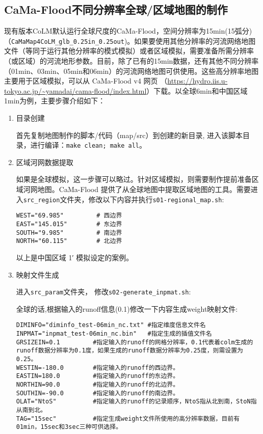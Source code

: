 \subsection{CaMa-Flood不同分辨率全球/区域地图的制作}
现有版本CoLM默认运行全球尺度的CaMa-Flood，空间分辨率为15min(15弧分)（\texttt{CaMaMap4CoLM\_glb\_0.25in\_0.25out})。如果要使用其他分辨率的河流网络地图文件（等同于运行其他分辨率的模式模拟）或者区域模拟，需要准备所需分辨率（或区域）的河流地形参数。目前，除了已有的15min数据，还有其他不同分辨率（01min、03min、05min和06min）的河流网络地图可供使用。这些高分辨率地图主要用于区域模拟，可以从 CaMa-Flood v4 网页 （\url{https://hydro.iis.u-tokyo.ac.jp/~yamadai/cama-flood/index.html}）下载。以全球6min和中国区域1min为例，主要步骤介绍如下：

\begin{enumerate}
\item 目录创建

首先复制地图制作的脚本/代码（map/src）到创建的新目录, 进入该脚本目录，进行编译：\verb|make clean; make all|。

\item 区域河网数据提取

如果是全球模拟，这一步骤可以略过。针对区域模拟，则需要制作提前准备区域河网地图。CaMa-Flood 提供了从全球地图中提取区域地图的工具。需要进入\texttt{src\_region}文件夹，修改以下内容并执行\texttt{s01-regional\_map.sh}:
\begin{lstlisting}
WEST="69.985"         # 西边界
EAST="145.015"        # 东边界
SOUTH="9.985"         # 南边界
NORTH="60.115"        # 北边界
\end{lstlisting}
以上是中国区域 \ang{;1;} 模拟设定的案例。

\item 映射文件生成

进入\texttt{src\_param}文件夹， 修改\texttt{s02-generate\_inpmat.sh}:

全球的话,根据输入的runoff信息(0.1\textdegree)修改一下内容生成weight映射文件:
\begin{lstlisting}
DIMINFO="diminfo_test-06min_nc.txt" #指定维度信息文件名
INPMAT="inpmat_test-06min_nc.bin"   #指定生成的插值文件名
GRSIZEIN=0.1         #指定输入的runoff的网格分辨率，0.1代表着colm生成的runoff数据分辨率为0.1度，如果生成的runoff数据分辨率为0.25度，则需设置为0.25。
WESTIN=-180.0        #指定输入的runoff的西边界。
EASTIN=180.0         #指定输入的runoff的东边界。
NORTHIN=90.0         #指定输入的runoff的北边界。
SOUTHIN=-90.0        #指定输入的runoff的南边界。
OLAT="NtoS"          #指定输入的runoff的记录顺序，NtoS指从北到南，StoN指从南到北。
TAG="15sec"          #指定生成weight文件所使用的高分辨率数据，目前有01min，15sec和3sec三种可供选择。
\end{lstlisting}


\end{enumerate}
